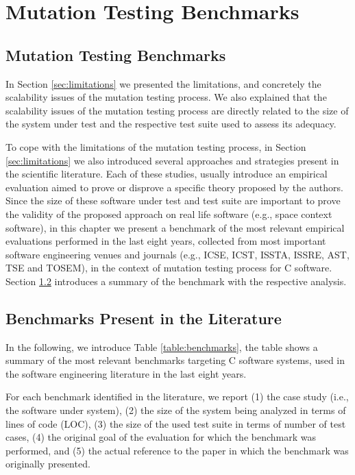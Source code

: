 
\chapter{Mutation Testing Benchmarks}
\label{chapter:industry}


\section{Mutation Testing Benchmarks}

In Section \ref{sec:limitations} we presented the limitations, and concretely the scalability issues of the mutation testing process. We also explained that the scalability issues of the mutation testing process are directly related to the size of the system under test and the respective test suite used to assess its adequacy. 

To cope with the limitations of the mutation testing process, in Section \ref{sec:limitations} we also introduced several approaches and strategies present in the scientific literature. 
Each of these studies, usually introduce an empirical evaluation aimed to prove or disprove a specific theory proposed by the authors. Since the size of these software under test and test suite are important to prove the validity of the proposed approach on real life software (e.g., space context software), in this chapter we present a benchmark of the most relevant empirical evaluations performed in the last eight years, collected from most important software engineering venues and journals (e.g., ICSE, ICST, ISSTA, ISSRE, AST, TSE and TOSEM), in the context of mutation testing process for C software. Section \ref{sec:benchmark} introduces a summary of the benchmark with the respective analysis.

\section{Benchmarks Present in the Literature}
\label{sec:benchmark}

In the following, we introduce Table \ref{table:benchmarks}, the table shows a summary of the most relevant benchmarks targeting C software systems, used in the software engineering literature in the last eight years. 

For each benchmark identified in the literature, we report (1) the case study (i.e., the software under system), (2) the size of the system being analyzed in terms of lines of code (LOC), (3) the size of the used test suite in terms of number of test cases, (4) the original goal of the evaluation for which the benchmark was performed, and (5) the actual reference to the paper in which the benchmark was originally presented. 


